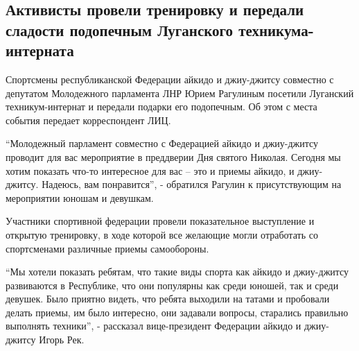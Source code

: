  
 
 
 
 
\subsection{Активисты провели тренировку и передали сладости подопечным Луганского техникума-интерната}
\label{sec:16_12_2021.stz.news.lnr.lug_info.2.ajkido}


Спортсмены республиканской Федерации айкидо и джиу-джитсу совместно с депутатом
Молодежного парламента ЛНР Юрием Рагулиным посетили Луганский техникум-интернат
и передали подарки его подопечным. Об этом с места события передает
корреспондент ЛИЦ.


\enquote{Молодежный парламент совместно с Федерацией айкидо и джиу-джитсу проводит для
вас мероприятие в преддверии Дня святого Николая. Сегодня мы хотим показать
что-то интересное для вас – это и приемы айкидо, и джиу-джитсу. Надеюсь, вам
понравится}, - обратился Рагулин к присутствующим на мероприятии юношам и
девушкам.


Участники спортивной федерации провели показательное выступление и открытую
тренировку, в ходе которой все желающие могли отработать со спортсменами
различные приемы самообороны.


\enquote{Мы хотели показать ребятам, что такие виды спорта как айкидо и джиу-джитсу
развиваются в Республике, что они популярны как среди юношей, так и среди
девушек. Было приятно видеть, что ребята выходили на татами и пробовали делать
приемы, им было интересно, они задавали вопросы, старались правильно выполнять
техники}, - рассказал вице-президент Федерации айкидо и джиу-джитсу Игорь Рек.

